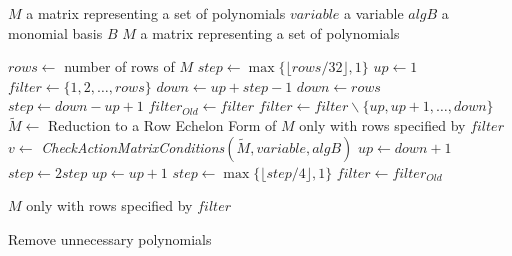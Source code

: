 \begin{algorithm}[!ht]
  \begin{algorithmic}[1]
    \Require
      \Statex $M$ a matrix representing a set of polynomials
      \Statex $variable$ a variable
      \Statex $algB$ a monomial basis $B$
    \Ensure
      \Statex $M$ a matrix representing a set of polynomials
      \Statex

      \State $rows \gets$ number of rows of $M$
      \State $step \gets \max\{\lfloor rows/32\rfloor, 1\}$ 
      \State $up \gets 1$
      \State $filter \gets \{1,2,\dots,rows\}$
        \State $down \gets up + step - 1$
          \State $down \gets rows$
	  \State $step \gets down - up + 1$
	\EndIf
	\State $filter_{Old} \gets filter$
	\State $filter \gets filter \backslash \{up, up+1, \dots, down\}$
	\State $\tilde{M} \gets$ Reduction to a Row Echelon Form of $M$ only with rows specified by $filter$
        \State $v \gets$ \textit{CheckActionMatrixConditions}$(\tilde{M}, variable, algB)$
          \State $up \gets down + 1$
	  \State $step \gets 2 step$
	\Else
	    \State $up \gets up + 1$
	  \Else
            \State $step \gets \max\{\lfloor step/4\rfloor, 1\}$
	  \EndIf
	  \State $filter \gets filter_{Old}$
	\EndIf
      \EndWhile

      \State \Return $M$ only with rows specified by $filter$
  \end{algorithmic}
  \caption{Remove unnecessary polynomials}
  \label{alg:removeUn}
\end{algorithm}

